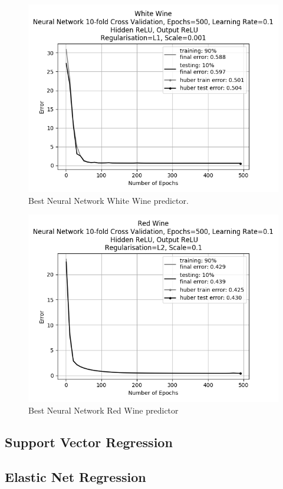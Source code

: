 \documentclass[10pt,twocolumn,letterpaper]{article}
\begin{document}
\begin{figure}[h]
	\begin{center}
		\includegraphics[width=0.9\linewidth]{img/best_white_nn.png}
	\end{center}
	\caption{Best Neural Network White Wine predictor.}
	\label{fig:wwbest}
\end{figure}

\begin{figure}[h]
	\begin{center}
		\includegraphics[width=0.9\linewidth]{img/best_red_nn.png}
	\end{center}
	\caption{Best Neural Network Red Wine predictor}
	\label{fig:rwbest}
\end{figure}

\subsection{Support Vector Regression}

\subsection{Elastic Net Regression}




{\small


}
\end{document}
